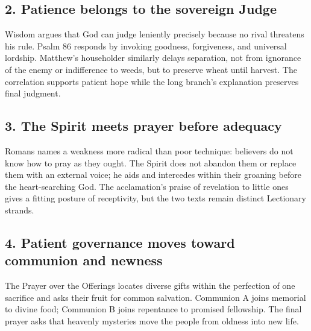 \subsection*{2. Patience belongs to the sovereign Judge\enspace{}}

Wisdom argues that God can judge leniently precisely because no rival threatens his rule. Psalm 86 responds by invoking goodness, forgiveness, and universal lordship. Matthew's householder similarly delays separation, not from ignorance of the enemy or indifference to weeds, but to preserve wheat until harvest. The correlation supports patient hope while the long branch's explanation preserves final judgment.

\subsection*{3. The Spirit meets prayer before adequacy\enspace{}}

Romans names a weakness more radical than poor technique: believers do not know how to pray as they ought. The Spirit does not abandon them or replace them with an external voice; he aids and intercedes within their groaning before the heart-searching God. The acclamation's praise of revelation to little ones gives a fitting posture of receptivity, but the two texts remain distinct Lectionary strands.

\subsection*{4. Patient governance moves toward communion and newness\enspace{}}

The Prayer over the Offerings locates diverse gifts within the perfection of one sacrifice and asks their fruit for common salvation. Communion A joins memorial to divine food; Communion B joins repentance to promised fellowship. The final prayer asks that heavenly mysteries move the people from oldness into new life.
